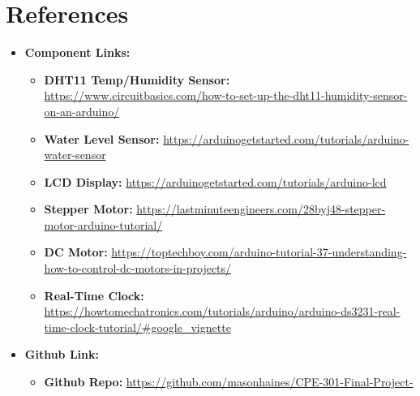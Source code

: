 \documentclass{article}
\begin{document}
\section {References}
\begin{itemize}
    \item \textbf{Component Links:}
    \begin{itemize}
        \item \textbf{DHT11 Temp/Humidity Sensor:} \url{https://www.circuitbasics.com/how-to-set-up-the-dht11-humidity-sensor-on-an-arduino/}
        \item \textbf{Water Level Sensor:} \url{https://arduinogetstarted.com/tutorials/arduino-water-sensor}
        \item \textbf{LCD Display:} \url{https://arduinogetstarted.com/tutorials/arduino-lcd}
        \item \textbf{Stepper Motor:} \url{https://lastminuteengineers.com/28byj48-stepper-motor-arduino-tutorial/}
        \item \textbf{DC Motor:} 
        \url{https://toptechboy.com/arduino-tutorial-37-understanding-how-to-control-dc-motors-in-projects/}
        \item \textbf{Real-Time Clock:} \url{https://howtomechatronics.com/tutorials/arduino/arduino-ds3231-real-time-clock-tutorial/#google_vignette}
    \end{itemize}
        \item\textbf{Github Link:}
    \begin{itemize}
        \item \textbf{Github Repo:} 
        \url {https://github.com/masonhaines/CPE-301-Final-Project-}
        \end{itemize}
\end{itemize}


\end{document}
